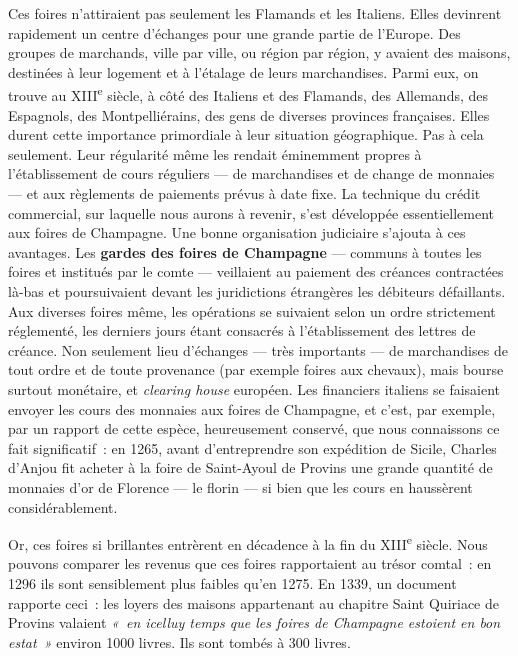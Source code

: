 \documentclass[french,twoside]{book} %
\newcommand\term[1]{\textbf{#1}}
\begin{document}
\noindent Ces foires n’attiraient pas seulement les Flamands et les Italiens. Elles devinrent rapidement un centre d’échanges pour une grande partie de l’Europe. Des groupes de marchands, ville par ville, ou région par région, y avaient des maisons, destinées à leur logement et à l’étalage de leurs marchandises. Parmi eux, on trouve au XIII\textsuperscript{e} siècle, à côté des Italiens et des Flamands, des Allemands, des Espagnols, des Montpelliérains, des gens de diverses provinces françaises. Elles durent cette importance primordiale à leur situation géographique. Pas à cela seulement. Leur régularité même les rendait éminemment propres à l’établissement de cours réguliers — de marchandises et de change de monnaies — et aux règlements de paiements prévus à date fixe. La technique du crédit commercial, sur laquelle nous aurons à revenir, s’est développée essentiellement aux foires de Champagne. Une bonne organisation judiciaire s’ajouta à ces avantages. Les \term{gardes des foires de Champagne} — communs à toutes les foires et institués par le comte — veillaient au paiement des créances contractées là-bas et poursuivaient devant les juridictions étrangères les débiteurs défaillants. Aux diverses foires même, les opérations se suivaient selon un ordre strictement réglementé, les derniers jours étant consacrés à l’établissement des lettres de créance. Non seulement lieu d’échanges — très importants — de marchandises de tout ordre et de toute provenance (par exemple foires aux chevaux), mais bourse surtout monétaire, et {\itshape clearing house} européen. Les financiers italiens se faisaient envoyer les cours des monnaies aux foires de Champagne, et c’est, par exemple, par un rapport de cette espèce, heureusement conservé, que nous connaissons ce fait significatif : en 1265, avant d’entreprendre son expédition de Sicile, Charles d’Anjou fit acheter à la foire de Saint-Ayoul de Provins une grande quantité de monnaies d’or de Florence — le florin — si bien que les cours en haussèrent considérablement.\par
Or, ces foires si brillantes entrèrent en décadence à la fin du XIII\textsuperscript{e} siècle. Nous pouvons comparer les revenus que ces foires rapportaient au trésor comtal : en 1296 ils sont sensiblement plus faibles qu’en 1275. En 1339, un document rapporte ceci : les loyers des maisons appartenant au chapitre Saint Quiriace de Provins valaient \emph{« en icelluy temps que les foires de Champagne estoient en bon estat »} environ 1000 livres. Ils sont tombés à 300 livres.\par
\end{document}
